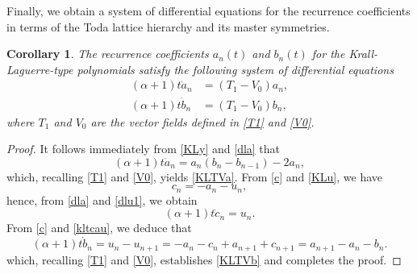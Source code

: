 \documentclass[10pt, reqno]{amsart}
\numberwithin{equation}{section}
\newtheorem{corollary}{Corollary}[section]
\numberwithin{equation}{section}
\begin{document}
Finally, we obtain a system of differential equations for the recurrence coefficients in terms of the Toda lattice hierarchy and its master symmetries.
\begin{corollary} \label{corollary 3.1}
The recurrence coefficients $a_n(t)$ and $b_n(t)$ for the Krall-Laguerre-type polynomials satisfy the following system of differential equations
\begin{align}
(\alpha+1)t\dot{a}_n&=(T_1-V_0)a_n,\label{KLTVa}\\
(\alpha+1)t\dot{b}_n&= (T_1-V_0)b_n, \label{KLTVb}
\end{align}
where $T_1$ and $V_0$ are the vector fields defined in \eqref{T1} and \eqref{V0}.
\end{corollary}
\begin{proof}
It follows immediately from \eqref{KLy} and \eqref{dla} that
\begin{equation*}
(\alpha+1)t\dot{a}_n=a_n(b_n-b_{n-1})-2a_n,
\end{equation*}
which, recalling \eqref{T1} and \eqref{V0}, yields \eqref{KLTVa}. From \eqref{c} and \eqref{KLu}, we have
\begin{equation}
c_n=-a_n-u_n,\label{kltcau}
\end{equation}
hence, from \eqref{dla} and \eqref{dlu1}, we obtain 
\begin{equation*}
(\alpha+1)t\dot{c}_n=u_n.
\end{equation*}
From \eqref{c} and \eqref{kltcau}, we deduce that
\begin{equation*}
(\alpha+1)t\dot{b}_n=u_n-u_{n+1}=-a_n-c_n+a_{n+1}+c_{n+1}=a_{n+1}-a_n-b_n.
\end{equation*}
which, recalling \eqref{T1} and \eqref{V0}, establishes \eqref{KLTVb} and completes the proof.
\end{proof}
\end{document}
